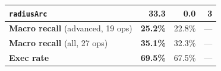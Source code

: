 \begin{table}[t]
\begin{tabular}{lrrr}
  \texttt{radiusArc}            & \textbf{33.3} & 0.0           & 3   \\
  \midrule                                                                                                             
  \textbf{Macro recall} (advanced, 19 ops) & \textbf{25.2\%} & 22.8\% & --- \\
  \textbf{Macro recall} (all, 27 ops)      & \textbf{35.1\%} & 32.3\% & --- \\                                         
  \textbf{Exec rate}                       & \textbf{69.5\%} & 67.5\% & --- \\                                         
  \bottomrule                                                                                                          
  \end{tabular} 
  
\end{table}